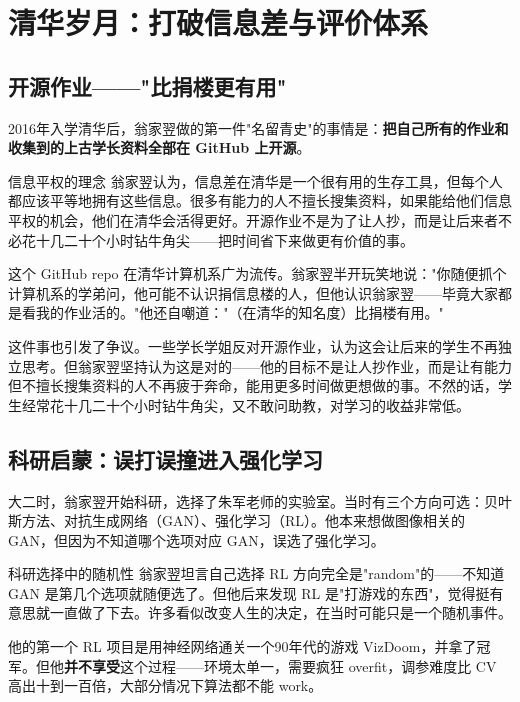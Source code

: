 \section{清华岁月：打破信息差与评价体系}

\subsection{开源作业——"比捐楼更有用"}

2016年入学清华后，翁家翌做的第一件"名留青史"的事情是：\textbf{把自己所有的作业和收集到的上古学长资料全部在 GitHub 上开源}。

\begin{importantbox}{信息平权的理念}
翁家翌认为，信息差在清华是一个很有用的生存工具，但每个人都应该平等地拥有这些信息。很多有能力的人不擅长搜集资料，如果能给他们信息平权的机会，他们在清华会活得更好。开源作业不是为了让人抄，而是让后来者不必花十几二十个小时钻牛角尖——把时间省下来做更有价值的事。
\end{importantbox}

这个 GitHub repo 在清华计算机系广为流传。翁家翌半开玩笑地说："你随便抓个计算机系的学弟问，他可能不认识捐信息楼的人，但他认识翁家翌——毕竟大家都是看我的作业活的。"他还自嘲道："（在清华的知名度）比捐楼有用。"

这件事也引发了争议。一些学长学姐反对开源作业，认为这会让后来的学生不再独立思考。但翁家翌坚持认为这是对的——他的目标不是让人抄作业，而是让有能力但不擅长搜集资料的人不再疲于奔命，能用更多时间做更想做的事。不然的话，学生经常花十几二十个小时钻牛角尖，又不敢问助教，对学习的收益非常低。

\subsection{科研启蒙：误打误撞进入强化学习}

大二时，翁家翌开始科研，选择了朱军老师的实验室。当时有三个方向可选：贝叶斯方法、对抗生成网络（GAN）、强化学习（RL）。他本来想做图像相关的 GAN，但因为不知道哪个选项对应 GAN，误选了强化学习。

\begin{warningbox}{科研选择中的随机性}
翁家翌坦言自己选择 RL 方向完全是"random"的——不知道 GAN 是第几个选项就随便选了。但他后来发现 RL 是"打游戏的东西"，觉得挺有意思就一直做了下去。许多看似改变人生的决定，在当时可能只是一个随机事件。
\end{warningbox}

他的第一个 RL 项目是用神经网络通关一个90年代的游戏 VizDoom，并拿了冠军。但他\textbf{并不享受}这个过程——环境太单一，需要疯狂 overfit，调参难度比 CV 高出十到一百倍，大部分情况下算法都不能 work。

